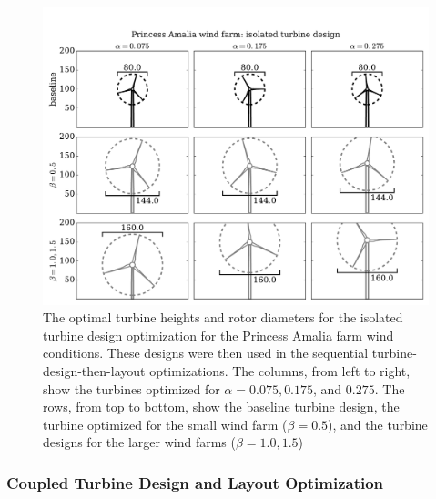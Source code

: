 \begin{figure}[htbp]
  \centering
  \includegraphics[width=\textwidth]{Figures/turbineSizesAmalia_sequential.pdf}
  \caption{\label{amaliaturbines_seq} The optimal turbine heights and rotor diameters for the isolated turbine design optimization for the Princess Amalia farm wind conditions. These designs were then used in the sequential turbine-design-then-layout optimizations. The columns, from left to right, show the turbines optimized for $\alpha=0.075,0.175$, and $0.275$. The rows, from top to bottom, show the baseline turbine design, the turbine optimized for the small wind farm ($\beta=0.5$), and the turbine designs for the larger wind farms ($\beta=1.0,1.5$)}
\end{figure}




\subsubsection{Coupled Turbine Design and Layout Optimization}

